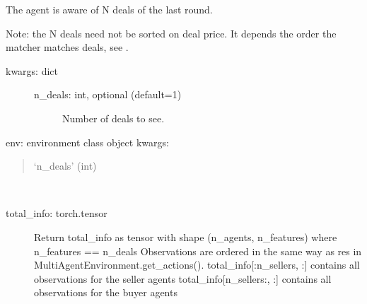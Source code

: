 \documentclass[letterpaper,10pt,english]{sphinxmanual}
\begin{document}
\begin{fulllineitems}
\label{\detokenize{MultiAgentMarketRL:info_setting.DealInformationSetting}}
\sphinxAtStartPar
The agent is aware of N deals of the last round.

\sphinxAtStartPar
Note: the N deals need not be sorted on deal price. It depends the order
the matcher matches deals, see .
\begin{description}
\item[{kwargs: dict}] \leavevmode\begin{description}
\item[{n\_deals: int, optional (default=1)}] \leavevmode
\sphinxAtStartPar
Number of deals to see.

\end{description}

\end{description}

\begin{fulllineitems}
\label{\detokenize{MultiAgentMarketRL:info_setting.DealInformationSetting.__init__}}
\sphinxAtStartPar
env: environment class object
kwargs:
\begin{quote}

\sphinxAtStartPar
‘n\_deals’ (int)
\end{quote}

\end{fulllineitems}


\begin{fulllineitems}
\label{\detokenize{MultiAgentMarketRL:info_setting.DealInformationSetting.get_states}}~\begin{description}
\item[{total\_info: torch.tensor}] \leavevmode
\sphinxAtStartPar
Return total\_info as tensor with shape (n\_agents, n\_features) where n\_features == n\_deals
Observations are ordered in the same way as res in MultiAgentEnvironment.get\_actions().
total\_info{[}:n\_sellers, :{]} contains all observations for the seller agents
total\_info{[}n\_sellers:, :{]} contains all observations for the buyer agents

\end{description}

\end{fulllineitems}


\end{fulllineitems}
\end{document}
